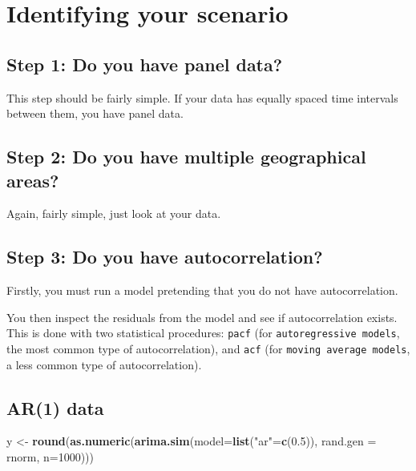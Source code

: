 \documentclass[]{book}
\newenvironment{Shaded}{\begin{snugshade}}{\end{snugshade}}
\newcommand{\KeywordTok}[1]{\textcolor[rgb]{0.13,0.29,0.53}{\textbf{#1}}}
\newcommand{\DataTypeTok}[1]{\textcolor[rgb]{0.13,0.29,0.53}{#1}}
\newcommand{\DecValTok}[1]{\textcolor[rgb]{0.00,0.00,0.81}{#1}}
\newcommand{\FloatTok}[1]{\textcolor[rgb]{0.00,0.00,0.81}{#1}}
\newcommand{\StringTok}[1]{\textcolor[rgb]{0.31,0.60,0.02}{#1}}
\newcommand{\NormalTok}[1]{#1}
\begin{document}
\newpage

\section{Identifying your scenario}\label{identifying-your-scenario}

\subsection{Step 1: Do you have panel
data?}\label{step-1-do-you-have-panel-data}

This step should be fairly simple. If your data has equally spaced time
intervals between them, you have panel data.

\subsection{Step 2: Do you have multiple geographical
areas?}\label{step-2-do-you-have-multiple-geographical-areas}

Again, fairly simple, just look at your data.

\subsection{Step 3: Do you have
autocorrelation?}\label{step-3-do-you-have-autocorrelation}

Firstly, you must run a model pretending that you do not have
autocorrelation.

You then inspect the residuals from the model and see if autocorrelation
exists. This is done with two statistical procedures: \texttt{pacf} (for
\texttt{autoregressive\ models}, the most common type of
autocorrelation), and \texttt{acf} (for
\texttt{moving\ average\ models}, a less common type of
autocorrelation).

\newpage 

\subsection{AR(1) data}\label{ar1-data}

\begin{Shaded}
\begin{Highlighting}[]
\NormalTok{y <-}\StringTok{ }\KeywordTok{round}\NormalTok{(}\KeywordTok{as.numeric}\NormalTok{(}\KeywordTok{arima.sim}\NormalTok{(}\DataTypeTok{model=}\KeywordTok{list}\NormalTok{(}\StringTok{"ar"}\NormalTok{=}\KeywordTok{c}\NormalTok{(}\FloatTok{0.5}\NormalTok{)), }\DataTypeTok{rand.gen =}\NormalTok{ rnorm, }\DataTypeTok{n=}\DecValTok{1000}\NormalTok{)))}
\end{Highlighting}
\end{Shaded}
\end{document}
